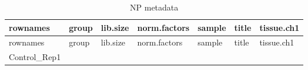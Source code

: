 \documentclass[
]{article}
\begin{document}
\begin{longtable}[]{@{}lllllll@{}}
\caption{\label{tab:NP-metadata}NP metadata}\tabularnewline
\toprule
\begin{minipage}[b]{0.12\columnwidth}\raggedright
rownames\strut
\end{minipage} & \begin{minipage}[b]{0.07\columnwidth}\raggedright
group\strut
\end{minipage} & \begin{minipage}[b]{0.13\columnwidth}\raggedright
lib.size\strut
\end{minipage} & \begin{minipage}[b]{0.13\columnwidth}\raggedright
norm.factors\strut
\end{minipage} & \begin{minipage}[b]{0.12\columnwidth}\raggedright
sample\strut
\end{minipage} & \begin{minipage}[b]{0.12\columnwidth}\raggedright
title\strut
\end{minipage} & \begin{minipage}[b]{0.13\columnwidth}\raggedright
tissue.ch1\strut
\end{minipage}\tabularnewline
\midrule
\endfirsthead
\toprule
\begin{minipage}[b]{0.12\columnwidth}\raggedright
rownames\strut
\end{minipage} & \begin{minipage}[b]{0.07\columnwidth}\raggedright
group\strut
\end{minipage} & \begin{minipage}[b]{0.13\columnwidth}\raggedright
lib.size\strut
\end{minipage} & \begin{minipage}[b]{0.13\columnwidth}\raggedright
norm.factors\strut
\end{minipage} & \begin{minipage}[b]{0.12\columnwidth}\raggedright
sample\strut
\end{minipage} & \begin{minipage}[b]{0.12\columnwidth}\raggedright
title\strut
\end{minipage} & \begin{minipage}[b]{0.13\columnwidth}\raggedright
tissue.ch1\strut
\end{minipage}\tabularnewline
\midrule
\endhead
\begin{minipage}[t]{0.12\columnwidth}\raggedright
Control\_Rep1\strut
\end{minipage} & \begin{minipage}[t]{0.07\columnwidth}\raggedright

\end{minipage}
\end{longtable}
\end{document}
